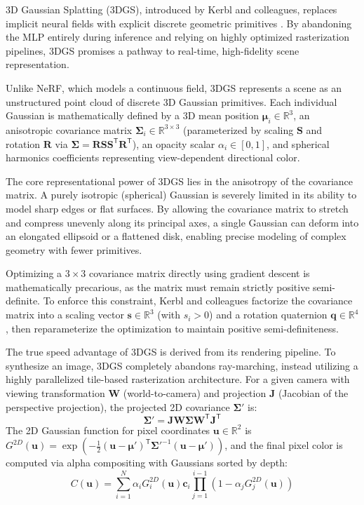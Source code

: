 \documentclass[12pt,a4paper,oneside]{report}
\begin{document}
3D Gaussian Splatting (3DGS), introduced by Kerbl and colleagues, replaces implicit neural fields with explicit discrete geometric primitives \cite{kerbl20233d}. By abandoning the MLP entirely during inference and relying on highly optimized rasterization pipelines, 3DGS promises a pathway to real-time, high-fidelity scene representation.

Unlike NeRF, which models a continuous field, 3DGS represents a scene as an unstructured point cloud of discrete 3D Gaussian primitives. Each individual Gaussian is mathematically defined by a 3D mean position $\boldsymbol{\mu}_i \in \mathbb{R}^3$, an anisotropic covariance matrix $\boldsymbol{\Sigma}_i \in \mathbb{R}^{3 \times 3}$ (parameterized by scaling $\mathbf{S}$ and rotation $\mathbf{R}$ via $\boldsymbol{\Sigma} = \mathbf{R} \mathbf{S} \mathbf{S}^\mathsf{T} \mathbf{R}^\mathsf{T}$), an opacity scalar $\alpha_i \in [0, 1]$, and spherical harmonics coefficients representing view-dependent directional color.

The core representational power of 3DGS lies in the anisotropy of the covariance matrix. A purely isotropic (spherical) Gaussian is severely limited in its ability to model sharp edges or flat surfaces. By allowing the covariance matrix to stretch and compress unevenly along its principal axes, a single Gaussian can deform into an elongated ellipsoid or a flattened disk, enabling precise modeling of complex geometry with fewer primitives.

Optimizing a $3 \times 3$ covariance matrix directly using gradient descent is mathematically precarious, as the matrix must remain strictly positive semi-definite. To enforce this constraint, Kerbl and colleagues factorize the covariance matrix into a scaling vector $\mathbf{s} \in \mathbb{R}^3$ (with $s_i > 0$) and a rotation quaternion $\mathbf{q} \in \mathbb{R}^4$, then reparameterize the optimization to maintain positive semi-definiteness.

The true speed advantage of 3DGS is derived from its rendering pipeline. To synthesize an image, 3DGS completely abandons ray-marching, instead utilizing a highly parallelized tile-based rasterization architecture. For a given camera with viewing transformation $\mathbf{W}$ (world-to-camera) and projection $\mathbf{J}$ (Jacobian of the perspective projection), the projected 2D covariance $\boldsymbol{\Sigma}'$ is:
\begin{equation}
\boldsymbol{\Sigma}' = \mathbf{J} \mathbf{W} \boldsymbol{\Sigma} \mathbf{W}^\mathsf{T} \mathbf{J}^\mathsf{T}
\end{equation}
The 2D Gaussian function for pixel coordinates $\mathbf{u} \in \mathbb{R}^2$ is $G^{2D}(\mathbf{u}) = \exp\left(-\frac{1}{2} (\mathbf{u} - \boldsymbol{\mu}')^\mathsf{T} \boldsymbol{\Sigma}'^{-1} (\mathbf{u} - \boldsymbol{\mu}')\right)$, and the final pixel color is computed via alpha compositing with Gaussians sorted by depth:
\begin{equation}
C(\mathbf{u}) = \sum_{i=1}^{N} \alpha_i G_i^{2D}(\mathbf{u}) \mathbf{c}_i \prod_{j=1}^{i-1} (1 - \alpha_j G_j^{2D}(\mathbf{u}))
\end{equation}
\end{document}
